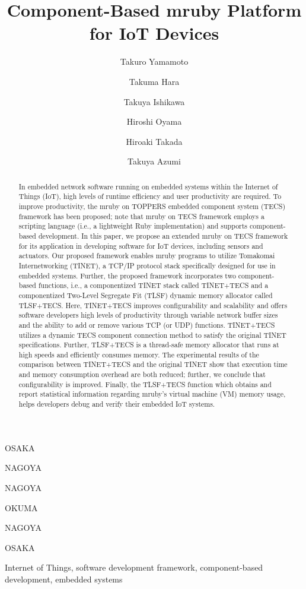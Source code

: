 \documentclass[JIP]{ipsj_v2/UTF8/ipsj}
\begin{document}
\title{Component-Based mruby Platform for IoT Devices}


\author{Takuro Yamamoto}{OSAKA}
\author{Takuma Hara}{NAGOYA}
\author{Takuya Ishikawa}{NAGOYA}
\author{Hiroshi Oyama}{OKUMA}
\author{Hiroaki Takada}{NAGOYA}
\author{Takuya Azumi}{OSAKA}


\begin{abstract}

In embedded network software running on embedded systems within the Internet of Things (IoT), high levels of runtime efficiency and user productivity are required.
To improve productivity, the mruby on TOPPERS embedded component system (TECS) framework has been proposed; note that mruby on TECS framework employs a scripting language (i.e., a lightweight Ruby implementation) and supports component-based development.
In this paper, we propose an extended mruby on TECS framework for its application in developing software for IoT devices, including sensors and actuators.
Our proposed framework enables mruby programs to utilize Tomakomai Internetworking (TINET), a TCP/IP protocol stack specifically designed for use in embedded systems.
Further, the proposed framework incorporates two component-based functions, i.e., a componentized TINET stack called TINET+TECS and a componentized Two-Level Segregate Fit (TLSF) dynamic memory allocator called TLSF+TECS.
Here, TINET+TECS improves configurability and scalability and offers software developers high levels of productivity through variable network buffer sizes and the ability to add or remove various TCP (or UDP) functions.
TINET+TECS utilizes a dynamic TECS component connection method to satisfy the original TINET specifications.
Further, TLSF+TECS is a thread-safe memory allocator that runs at high speeds and efficiently consumes memory.
The experimental results of the comparison between TINET+TECS and the original TINET show that execution time and memory consumption overhead are both reduced; further, we conclude that configurability is improved.
Finally, the TLSF+TECS function which obtains and report statistical information regarding mruby's virtual machine (VM) memory usage, helps developers debug and verify their embedded IoT systems.

\end{abstract}

\begin{keyword}
Internet of Things, software development framework, component-based development, embedded systems
\end{keyword}
\end{document}
